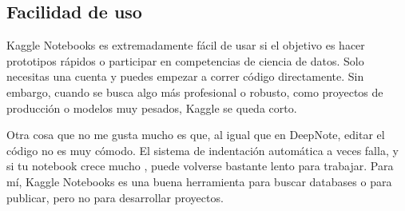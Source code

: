\documentclass[a4paper,12pt]{article}
\begin{document}
\subsection{Facilidad de uso}
Kaggle Notebooks es extremadamente fácil de usar si el objetivo es hacer
prototipos rápidos o participar en competencias de ciencia de datos. Solo
necesitas una cuenta y puedes empezar a correr código directamente. Sin embargo,
cuando se busca algo más profesional o robusto, como proyectos de producción o
modelos muy pesados, Kaggle se queda corto.

Otra cosa que no me gusta mucho es que, al igual que en DeepNote, editar el
código no es muy cómodo. El sistema de indentación automática a veces falla, y
si tu notebook crece mucho \cite{kaggle_limitations}, puede volverse bastante lento para trabajar. Para
mí, Kaggle Notebooks es una buena herramienta para buscar databases o para
publicar, pero no para desarrollar proyectos.


\newpage


\end{document}

